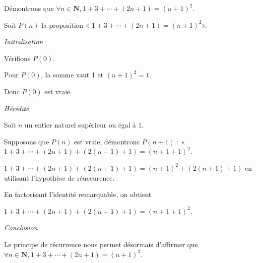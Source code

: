 \documentclass[varwidth,convert]{standalone}
\begin{document}
Démontrons que $\forall n \in \mathbf{N}, 1 + 3 + \cdots + (2n+1) =
(n+1)^2$.

Soit $P(n)$ la proposition « $1 + 3 + \cdots + (2n+1) = (n+1)^2$».

\emph{Initialisation}

Vérifions $P(0)$.

Pour $P(0)$, la somme vaut 1 et $(n+1)^2 = 1$.

Donc $P(0)$ est vraie.

\emph{Hérédité}

Soit $n$ un entier naturel supérieur ou égal à 1.

Supposons que $P(n)$ est vraie, démontrons $P(n+1)$ : « $1 + 3 + \cdots
+ (2n+1) + (2(n+1)+1) = (n+1 +1)^2$.

$1 + 3 + \cdots + (2n+1) + (2(n+1)+1) = (n+1)^2 + (2(n+1)+1)$ en
utilisant l'hypothèse de réuccurence.

En factorisant l'identité remarquable, on obtient

\centering $\boxed{1 + 3 + \cdots + (2n+1) + (2(n+1)+1) = (n+1 +1)^2}$.

\emph{Conclusion}

Le principe de récurrence nous permet désormais d'affirmer que $\forall
n \in \mathbf{N}, 1 + 3 + \cdots + (2n+1) = (n+1)^2$.
\end{document}
